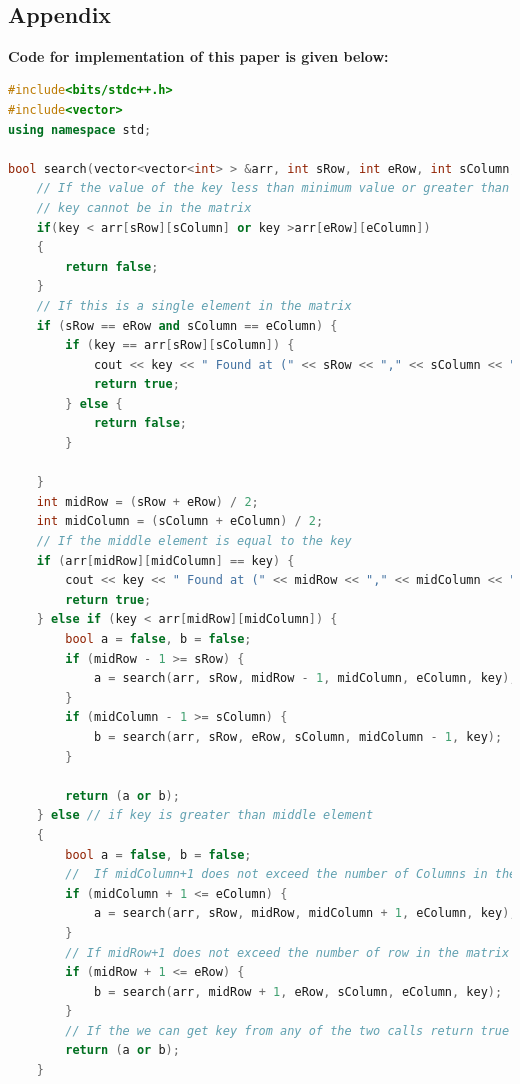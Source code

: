 \documentclass[conference]{IEEEtran}
\begin{document}
\color{black}
\
\begin{titlepage}
    \begin{center}
        \Huge
        \section*{Appendix}
        \end{center}
         \textbf{Code for implementation of this paper is given below:}
\begin{lstlisting}[language=C++,caption=Code for this paper]
#include<bits/stdc++.h>
#include<vector>
using namespace std;

bool search(vector<vector<int> > &arr, int sRow, int eRow, int sColumn, int eColumn, int key) {
    // If the value of the key less than minimum value or greater than the maximum value in the matrix 
    // key cannot be in the matrix 
    if(key < arr[sRow][sColumn] or key >arr[eRow][eColumn])
    {
        return false;
    }
    // If this is a single element in the matrix 
    if (sRow == eRow and sColumn == eColumn) {
        if (key == arr[sRow][sColumn]) {
            cout << key << " Found at (" << sRow << "," << sColumn << ")" << endl;
            return true;
        } else {
            return false;
        }

    }
    int midRow = (sRow + eRow) / 2;
    int midColumn = (sColumn + eColumn) / 2;
    // If the middle element is equal to the key 
    if (arr[midRow][midColumn] == key) {
        cout << key << " Found at (" << midRow << "," << midColumn << ")" << endl;
        return true;
    } else if (key < arr[midRow][midColumn]) {
        bool a = false, b = false;
        if (midRow - 1 >= sRow) {
            a = search(arr, sRow, midRow - 1, midColumn, eColumn, key);
        }
        if (midColumn - 1 >= sColumn) {
            b = search(arr, sRow, eRow, sColumn, midColumn - 1, key);
        }

        return (a or b);
    } else // if key is greater than middle element 
    {
        bool a = false, b = false;
        //  If midColumn+1 does not exceed the number of Columns in the matrix 
        if (midColumn + 1 <= eColumn) {
            a = search(arr, sRow, midRow, midColumn + 1, eColumn, key);
        }
        // If midRow+1 does not exceed the number of row in the matrix 
        if (midRow + 1 <= eRow) {
            b = search(arr, midRow + 1, eRow, sColumn, eColumn, key);
        }
        // If the we can get key from any of the two calls return true
        return (a or b);
    }


\end{lstlisting}
\end{titlepage}
\end{document}
